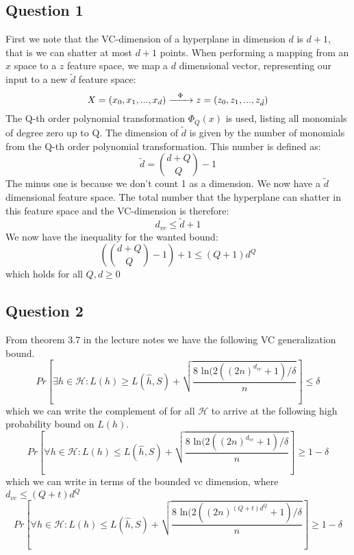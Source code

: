 \documentclass{article}
\begin{document}
\subsection{Question 1}
First we note that the VC-dimension of a hyperplane in dimension $d$ is $d+1$, that is we can shatter at most $d+1$ points. 
When performing a mapping from an $x$ space to a $z$ feature space, we map a $d$ dimensional vector, representing our input to a new $\tilde{d}$ feature space:
$$
X = (x_0,x_1,...,x_d) \xrightarrow{\text{  \hspace{0.15cm}} \Phi \text{  \hspace{0.15cm}}} z = (z_0,z_1,...,z_{\tilde{d} })
$$
The Q-th order polynomial transformation $\Phi_Q(x)$ is used, listing all monomials of degree zero up to Q. The dimension of $\tilde{d}$ is given by the number of monomials from the Q-th order polynomial transformation. This number is defined as:
\begin{equation}
\tilde{d} = \binom{d+Q}{Q}-1
\end{equation}
The minus one is because we don't count 1 as a dimension.
We now have a $\tilde{d}$ dimensional feature space. The total number that the hyperplane can shatter in this feature space and the VC-dimension is therefore:
\begin{equation}
d_{vc} \leq  \tilde{d} + 1
\end{equation}
We now have the inequality for the wanted bound:
\begin{equation}
\left( \binom{d+Q}{Q}-1 \right) + 1 \leq (Q+1)d^Q
\end{equation}
which holds for all $Q,d \geq 0$
\subsection{Question 2}
From theorem 3.7 in the lecture notes we have the following VC generalization bound.
\begin{equation}
Pr \left[ \exists h \in \mathcal{H}: L(h) \geq L(\hat{h},S)+
\sqrt{ \dfrac{8 \text{ ln} (2((2n)^{d_{vc}}+1) / \delta}{n}} \right] \leq \delta 
\end{equation}
which we can write the complement of for all $\mathcal{H}$ to arrive at the following high probability bound on $L(h)$.
\begin{equation}
Pr \left[ \forall h \in \mathcal{H}: L(h) \leq L(\hat{h},S)+
\sqrt{ \dfrac{8 \text{ ln} (2((2n)^{d_{vc}}+1) / \delta}{n}} \right] \geq 1- \delta 
\end{equation}
which we can write in terms of the bounded vc dimension, where $d_{vc} \leq (Q+t)d^Q$
\begin{equation}
Pr \left[ \forall h \in \mathcal{H}: L(h) \leq L(\hat{h},S)+
\sqrt{ \dfrac{8 \text{ ln} (2((2n)^{(Q+t)d^Q}+1) / \delta}{n}} \right] \geq 1- \delta 
\end{equation}
\end{document}

